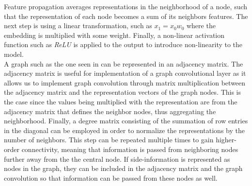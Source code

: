 Feature propagation averages representations in the neighborhood of a node, such that the representation of each node becomes a sum of its neighbors features.
The next step is using a linear transformation, such as $x_1 = x_0w_0$ where the embedding is multiplied with some weight.
Finally, a non-linear activation function such as \textit{ReLU} is applied to the output to introduce non-linearity to the model.
\\
A graph such as the one seen in  can be represented in an adjacency matrix. 
The adjacency matrix is useful for implementation of a graph convolutional layer as it allows us to implement graph convolution through matrix multiplication between the adjacency matrix and the representation vectors of the graph nodes.
This is the case since the values being multiplied with the representation are from the adjacency matrix that defines the neighbor nodes, thus aggregating the neighborhood.
Finally, a degree matrix consisting of the summation of row entries in the diagonal can be employed in order to normalize the representations by the number of neighbors.
This step can be repeated multiple times to gain higher-order connectivity, meaning that information is passed from neighboring nodes further away from the the central node\cite{SimplifyingGCN, KOrderConnectivity}.
If side-information is represented as nodes in the graph, they can be included in the adjacency matrix and the graph convolution so that information can be passed from these nodes as well.

